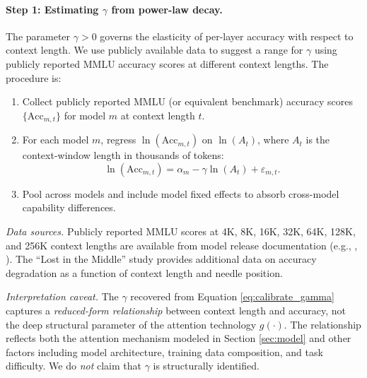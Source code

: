 \paragraph{Step 1: Estimating $\gamma$ from power-law decay.} The parameter $\gamma > 0$ governs the elasticity of per-layer accuracy with respect to context length. We use publicly available data to suggest a range for $\gamma$ using publicly reported MMLU accuracy scores at different context lengths. The procedure is:
\begin{enumerate}
\item[(i)] Collect publicly reported MMLU (or equivalent benchmark) accuracy scores $\{\text{Acc}_{m,t}\}$ for model $m$ at context length $t$.
\item[(ii)] For each model $m$, regress $\ln(\text{Acc}_{m,t})$ on $\ln(A_t)$, where $A_t$ is the context-window length in thousands of tokens:
\begin{equation}\label{eq:calibrate_gamma}
\ln(\text{Acc}_{m,t}) = \alpha_m - \gamma \ln(A_t) + \varepsilon_{m,t}.
\end{equation}
\item[(iii)] Pool across models and include model fixed effects to absorb cross-model capability differences.
\end{enumerate}

\textit{Data sources.} Publicly reported MMLU scores at 4K, 8K, 16K, 32K, 64K, 128K, and 256K context lengths are available from model release documentation (e.g., \citealp{openai2024gpt4}, \citealp{anthropic2024claude}). The ``Lost in the Middle'' study \citep{liu2024lost} provides additional data on accuracy degradation as a function of context length and needle position.

\textit{Interpretation caveat.} The $\gamma$ recovered from Equation \ref{eq:calibrate_gamma} captures a \emph{reduced-form relationship} between context length and accuracy, not the deep structural parameter of the attention technology $g(\cdot)$. The relationship reflects both the attention mechanism modeled in Section \ref{sec:model} and other factors including model architecture, training data composition, and task difficulty. We do \emph{not} claim that $\gamma$ is structurally identified.

